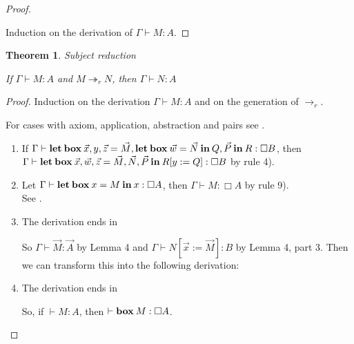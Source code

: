 \documentclass[a4paper]{article}
\newtheorem{theorem}{Theorem}
\begin{document}
\begin{proof}
  $ $

Induction on the derivation of $\Gamma \vdash M : A$.

\end{proof}

\begin{theorem} Subject reduction

  If $\Gamma \vdash M : A$ and $M \twoheadrightarrow_r N$, then $\Gamma \vdash N : A$

\end{theorem}

\begin{proof}

Induction on the derivation $\Gamma \vdash M : A$ and on the generation of $\rightarrow_r$.

For cases with axiom, application, abstraction and pairs see \cite{Morten} \cite{Pierce}.

\begin{enumerate}

\item If $\Gamma \vdash {\bf let \: box \:} \vec{x}, y, \vec{z} = \vec{M}, {\bf let \: box \: } \vec{w} = \vec{N} {\bf \: in \: } Q, \vec{P}  {\: \bf in \:} R : \Box B$,
  then $\Gamma \vdash {\bf let \: box \:} \vec{x}, \vec{w}, \vec{z} = \vec{M}, \vec{N}, \vec{P} \: { \bf in } \: R [y := Q] : \Box B$ by rule 4).
\item Let $\Gamma \vdash {\bf let \: box \:} x = M {\: \bf in \: } x : \Box A$,
then $\Gamma \vdash M : \Box A$ by rule 9). \\ See \cite{ModalK}.
\item The derivation ends in
\begin{prooftree}
\end{prooftree}
So $\Gamma \vdash \vec{M} : \vec{A}$ by Lemma 4 and $\Gamma \vdash N [\vec{x} := \vec{M}] : B$ by Lemma 4, part 3.
Then we can transform this into the following derivation:
\begin{prooftree}
\end{prooftree}
\item The derivation ends in
\begin{prooftree}
\end{prooftree}
So, if $\vdash M : A$, then $\vdash {\bf box \:} M : \Box A$.
\end{enumerate}
\end{proof}
\end{document}
